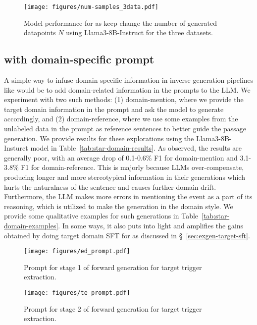 \begin{figure*}[t]
    \centering
    \texttt{[image: figures/num-samples\_3data.pdf]}
    \caption{Model performance for \modelName{} as keep change the number of generated datapoints $N$ using Llama3-8B-Instruct for the three datasets.}
    \label{fig:appendix-numsamples-analysis}
\end{figure*}

\subsection{\starName{} with domain-specific prompt}
\label{sec:appendix-analysis-star-domain}

A simple way to infuse domain specific information in inverse generation pipelines like \starName{} would be to add domain-related information in the prompts to the LLM.
We experiment with two such methods:
(1) domain-mention, where we provide the target domain information in the prompt and ask the model to generate accordingly, and
(2) domain-reference, where we use some examples from the unlabeled data in the prompt as reference sentences to better guide the passage generation.
We provide results for these explorations using the Llama3-8B-Insturct model in Table~\ref{tab:star-domain-results}.
As observed, the results are generally poor, with an average drop of 0.1-0.6\% F1 for domain-mention and 3.1-3.8\% F1 for domain-reference.
This is majorly because LLMs over-compensate, producing longer and more stereotypical information in their generations which hurts the naturalness of the sentence and causes further domain drift.
Furthermore, the LLM makes more errors in mentioning the event as a part of its reasoning, which is utilized to make the generation in the domain style.
We provide some qualitative examples for such generations in Table~\ref{tab:star-domain-examples}.
In some ways, it also puts into light and amplifies the gains obtained by doing target domain SFT for \modelName{} as discussed in \S~\ref{sec:exgen-target-sft}.

\begin{figure}[t]
    \centering
    \texttt{[image: figures/ed\_prompt.pdf]}
    \caption{Prompt for stage 1 of forward generation for target trigger extraction.}
    \label{fig:ed_prompt}
\end{figure}

\begin{figure}[t]
    \centering
    \texttt{[image: figures/te\_prompt.pdf]}
    \caption{Prompt for stage 2 of forward generation for target trigger extraction.}
    \label{fig:te_prompt}
\end{figure}

